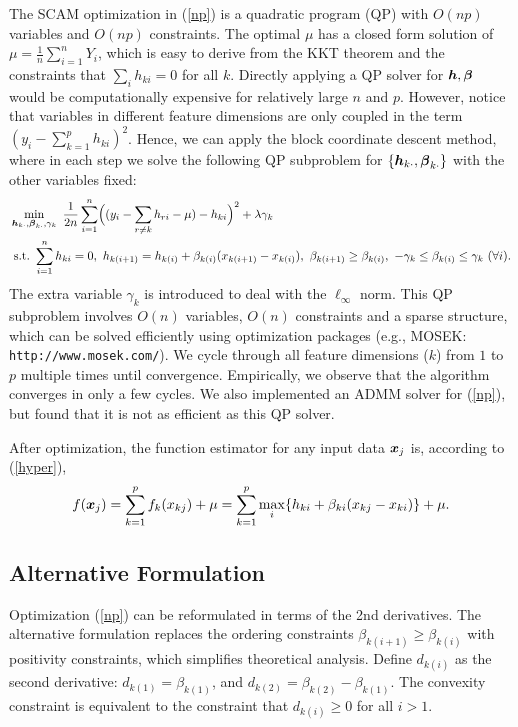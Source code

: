 The SCAM optimization in (\ref{np}) is a quadratic program (QP) with $O(np)$ variables and $O(np)$ constraints. The optimal $\mu$ has a closed form solution of $\mu = \frac{1}{n}\sum_{i=1}^n Y_i$, which is easy to derive from the KKT theorem and the constraints that $\sum_i h_{ki} = 0$ for all $k$.
Directly applying a QP solver for $\boldsymbol{h}, \boldsymbol{\beta}$ would be computationally expensive for relatively large $n$ and $p$. However, notice that variables
in different feature dimensions are only coupled in the term $(y_{i}-\sum_{k=1}^{p}h_{ki})^{2}$. Hence, we can apply the block coordinate descent method,
where in each step we solve the following QP subproblem for
$\{\boldsymbol{h}_{k\cdot},\boldsymbol{\beta}_{k\cdot}\}$ with the other variables fixed:
\begin{equation}\begin{split}\nonumber
       &\min_{\bds{h}_{k\cdot},\bds{\beta}_{k\cdot},\gamma_{k}} 
                       \ \frac{1}{2n}\sum_{i=1}^{n}\Bigl((y_{i}-\sum_{r\neq{k}}h_{ri}-\mu)-h_{ki}\Bigr)^{2} 
                         + \lambda\gamma_{k} \\
        &\ \textrm{s.t.} \ \sum_{i=1}^{n}h_{ki}=0, \ h_{k(i+1)} = h_{k(i)} + \beta_{k(i)}(x_{k(i+1)}-x_{k(i)}), \ \beta_{k(i+1)} \geq \beta_{k(i)}, \ -\gamma_{k}\leq\beta_{k(i)}\leq\gamma_{k} \ (\forall i).
\end{split}\end{equation}
The extra variable $\gamma_{k}$ is introduced to deal with the $\ell_{\infty}$ norm. This QP subproblem involves $O(n)$ variables, $O(n)$ constraints and a sparse structure, 
which can be solved efficiently using optimization packages (e.g., MOSEK: \verb+http://www.mosek.com/+).  We cycle through all feature dimensions ($k$) from $1$ to $p$ multiple times until convergence.
Empirically, we observe that the algorithm converges in only a few cycles. We also implemented an ADMM solver for (\ref{np}), but found that it is not as efficient as this QP solver.

After optimization, the function estimator for any input data $\boldsymbol{x}_j$ is, according to (\ref{hyper}),
\begin{equation}\nonumber
      f(\boldsymbol{x}_j) = \sum_{k=1}^{p}f_k(x_{kj})+\mu = \sum_{k=1}^{p}\max_{i} \{h_{ki}+\beta_{ki}(x_{kj}-x_{ki})\} + \mu.
\end{equation} 


\subsection{Alternative Formulation}
Optimization (\ref{np}) can be reformulated in terms of the 2nd derivatives. The alternative formulation replaces the ordering
constraints $\beta_{k(i+1)} \geq \beta_{k(i)}$ with positivity
constraints, which simplifies theoretical analysis.
Define $d_{k(i)}$ as the second derivative:
$d_{k(1)} = \beta_{k(1)}$, and $d_{k(2)} =
\beta_{k(2)} - \beta_{k(1)}$. The convexity constraint is
equivalent to the constraint that $d_{k(i)} \geq 0$ for all $i >
1$.

